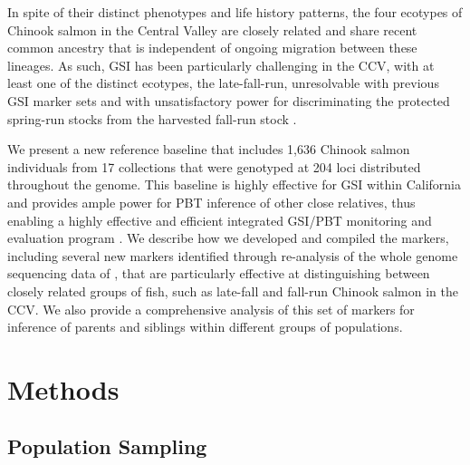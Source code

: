 In spite of their distinct phenotypes and life history patterns, the four ecotypes of Chinook salmon in the Central Valley are closely related
\citep{clemento2014evaluation} and share recent common ancestry that is independent of ongoing migration between these lineages. As such, GSI
has been particularly challenging in the CCV, with at least one of the distinct ecotypes, the late-fall-run, unresolvable with previous GSI marker sets
and with unsatisfactory power for discriminating the protected spring-run stocks from the
harvested fall-run stock \citep{seeb2007development,clemento2014evaluation}.

We present a new reference baseline that includes 1,636 Chinook salmon individuals from 17 collections that were genotyped at 204 loci distributed throughout the genome.
This baseline is highly effective for GSI within California and provides ample power for PBT inference of other close relatives, thus enabling a highly effective and efficient integrated GSI/PBT monitoring and evaluation program 
\citep{garza2007large,beacham2021parentage}.
We describe how we developed and compiled the markers, including several new markers
identified through re-analysis of the whole genome sequencing data of \citet{thompson2020complex},
that are particularly effective at distinguishing between closely related groups of fish,
such as late-fall and fall-run Chinook salmon in the CCV.  We also provide a comprehensive analysis of this
set of markers for inference of parents and siblings within different groups of populations.



 \section*{Methods}

\subsection*{Population Sampling}

